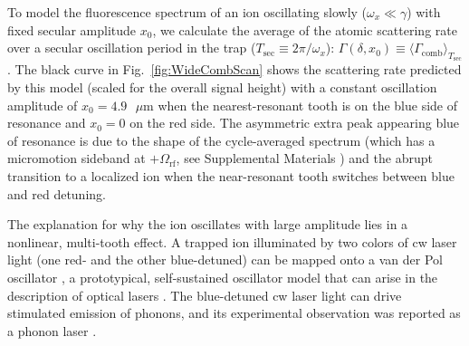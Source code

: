 \documentclass[preprint,superscriptaddress,amsmath,amssymb,aps,prl]{revtex4-1}
\begin{document}
To model the fluorescence spectrum of an ion oscillating slowly ($\omega_x \ll \gamma$) with fixed secular amplitude $x_0$, we calculate the average of the atomic scattering rate over a secular oscillation period in the trap ($T_\mathrm{sec} \equiv 2 \pi/\omega_x$): $\Gamma(\delta,x_0) \equiv \langle \Gamma_\mathrm{comb} \rangle_{T_\mathrm{sec}}$  \cite{SupplementalMaterials}.
The black curve in Fig.~\ref{fig:WideCombScan} shows the scattering rate predicted by this model (scaled for the overall signal height) with a constant oscillation amplitude of $x_0=4.9 \mbox{ }\mu\mbox{m}$ when the nearest-resonant tooth is on the blue side of resonance and $x_0=0$ on the red side.  The asymmetric extra peak appearing blue of resonance is due to the shape of the cycle-averaged spectrum (which has a micromotion sideband at $+\Omega_\mathrm{rf}$, see Supplemental Materials \cite{SupplementalMaterials}) and the abrupt transition to a localized ion when the near-resonant tooth switches between blue and red detuning. 

The explanation for why the ion oscillates with large amplitude lies in a nonlinear, multi-tooth effect.  A trapped ion illuminated by two colors of cw laser light (one red- and the other blue-detuned) can be mapped onto a van der Pol oscillator \cite{Vahala2009a,Knunz2010injection,Lee2013quantum}, a prototypical, self-sustained oscillator model that can arise in the description of optical lasers \cite{Yariv1974frequency}.  The blue-detuned cw laser light can drive stimulated emission of phonons, and its experimental observation was reported as a phonon laser \cite{Vahala2009a}.
\end{document}
